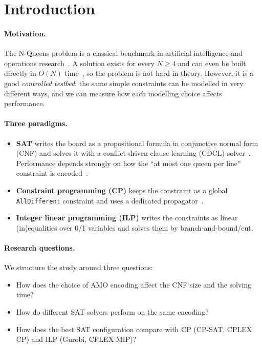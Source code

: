 \documentclass[a4paper,fleqn]{cas-sc}
\begin{document}
\section{Introduction}

\paragraph{Motivation.}
The N-Queens problem is a classical benchmark in artificial intelligence and operations research~\cite{bell2009,letavec2002}. A solution exists for every $N\ge4$ and can even be built directly in $O(N)$ time~\cite{bell2009}, so the problem is not hard in theory. However, it is a good \emph{controlled testbed}: the same simple constraints can be modelled in very different ways, and we can measure how each modelling choice affects performance.

\paragraph{Three paradigms.}
\begin{itemize}
  \item \textbf{SAT} writes the board as a propositional formula in conjunctive normal form (CNF) and solves it with a conflict-driven clause-learning (CDCL) solver~\cite{handbook2009,marques2009}. Performance depends strongly on how the ``at most one queen per line'' constraint is encoded~\cite{frisch2010,sinz2005,klieber2007,chen2010}.
  \item \textbf{Constraint programming (CP)} keeps the constraint as a global \texttt{AllDifferent} constraint and uses a dedicated propagator~\cite{regin1994}.
  \item \textbf{Integer linear programming (ILP)} writes the constraints as linear (in)equalities over 0/1 variables and solves them by branch-and-bound/cut.
\end{itemize}

\paragraph{Research questions.} We structure the study around three questions:
\begin{itemize}
  \item[\textbf{RQ1}] How does the choice of AMO encoding affect the CNF size and the solving time?
  \item[\textbf{RQ2}] How do different SAT solvers perform on the same encoding?
  \item[\textbf{RQ3}] How does the best SAT configuration compare with CP (CP-SAT, CPLEX CP) and ILP (Gurobi, CPLEX MIP)?
\end{itemize}
\end{document}
